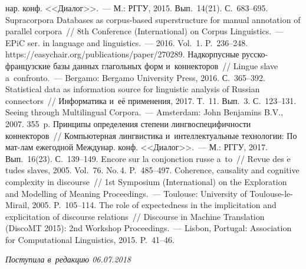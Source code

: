 \begin{multicols}{2}
{{\begin{thebibliography}{99}
\noindent
нар. конф. 
<<Диалог>>.~--- М.: РГГУ, 2015. Вып.~14(21). С.~683--695.
   Supracorpora Databases as corpus-based superstructure for 
manual annotation of parallel corpora~// 8th Conference (International) on Corpus 
Linguistics.~--- EPiC ser. in language and linguistics.~--- 2016. Vol.~1.  
P.~236--248. {\sf https://easychair.org/\linebreak publications/paper/270289}.
   Надкорпусные рус\-ско-фран\-цуз\-ские базы 
данных глагольных форм и~коннекторов~// Lingue slave a~confronto.~--- 
Bergamo: Bergamo University Press, 2016. С.~365--392.
   Statistical data as information source for linguistic 
analysis of Russian connectors~// Информатика и~её применения, 2017. Т.~11. 
Вып.~3. С.~123--131.
   Seeing through Multilingual Corpora.~--- Amsterdam: John 
Benjamins B.V., 2007. 355~p.
   Принципы определения степени лингвоспецифичности 
коннекторов~// Компьютерная лингвистика и~интеллектуальные технологии: 
По мат-лам ежегодной Междунар. конф. <<Диалог>>.~--- М.: РГГУ, 2017. 
Вып.~16(23). С.~139--149.
   Encore sur la conjonction russe a~to~// Revue des 
$\acute{\mbox{e}}$tudes slaves, 2005. Vol.~76. No.\,4. P.~485--497.
   Coherence, causality and cognitive complexity in 
discourse~// 1st Symposium (International) on the Exploration and Modelling of 
Meaning Proceedings.~--- Toulouse: University of Toulouse-le-Mirail, 2005. 
P.~105--114.
   The role of expectedness in the 
implicitation and explicitation of discourse relations~// Discourse in Machine 
Translation (DiscoMT 2015): 2nd Workshop Proceedings.~--- Lisbon, Portugal: 
Association for Computational Linguistics, 2015. P.~41--46.
  
\end{thebibliography}
} }

\end{multicols}

 \label{end\stat}

 \vspace*{-3pt}

\hfill{\small\textit{Поступила в~редакцию  06.07.2018}}


\renewcommand{\figurename}{\protect\bf Рис.}
\renewcommand{\tablename}{\protect\bf Таблица}